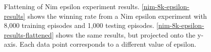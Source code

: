 \documentclass[11pt,a4paper]{report}
\begin{document}
\begin{figure}[htbp]
    \centering
    \caption{Flattening of Nim epsilon experiment results. \ref{nim-8k-epsilon-results} shows the winning rate from a Nim epsilon experiment with 8,000 training episodes and 1,000 testing episodes. \ref{nim-8k-epsilon-results-flattened} shows the same results, but projected onto the y-axis. Each data point corresponds to a different value of epsilon.}
    \label{nim-epsilon-flattening}
\end{figure}
\end{document}
